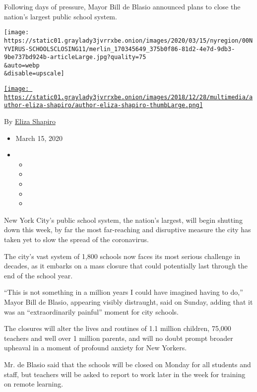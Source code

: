 Following days of pressure, Mayor Bill de Blasio announced plans to
close the nation's largest public school system.

\texttt{[image: https://static01.graylady3jvrrxbe.onion/images/2020/03/15/nyregion/00NYVIRUS-SCHOOLSCLOSING11/merlin\_170345649\_375b0f86-81d2-4e7d-9db3-9be737bd924b-articleLarge.jpg?quality=75\\\&auto=webp\\\&disable=upscale]}

\href{https://www.nytimes3xbfgragh.onion/by/eliza-shapiro}{\texttt{[image: https://static01.graylady3jvrrxbe.onion/images/2018/12/28/multimedia/author-eliza-shapiro/author-eliza-shapiro-thumbLarge.png]}}

By \href{https://www.nytimes3xbfgragh.onion/by/eliza-shapiro}{Eliza
Shapiro}

\begin{itemize}
\item
  March 15, 2020
\item
  \begin{itemize}
  \item
  \item
  \item
  \item
  \item
  \end{itemize}
\end{itemize}

New York City's public school system, the nation's largest, will begin
shutting down this week, by far the most far-reaching and disruptive
measure the city has taken yet to slow the spread of the coronavirus.

The city's vast system of 1,800 schools now faces its most serious
challenge in decades, as it embarks on a mass closure that could
potentially last through the end of the school year.

``This is not something in a million years I could have imagined having
to do,'' Mayor Bill de Blasio, appearing visibly distraught, said on
Sunday, adding that it was an ``extraordinarily painful'' moment for
city schools.

The closures will alter the lives and routines of 1.1 million children,
75,000 teachers and well over 1 million parents, and will no doubt
prompt broader upheaval in a moment of profound anxiety for New Yorkers.

Mr. de Blasio said that the schools will be closed on Monday for all
students and staff, but teachers will be asked to report to work later
in the week for training on remote learning.

